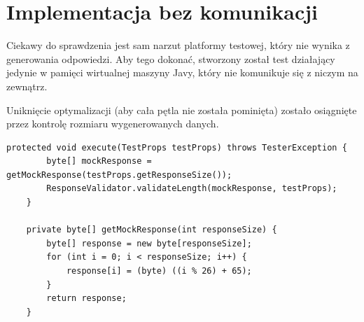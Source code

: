 \section{Implementacja bez komunikacji}

Ciekawy do sprawdzenia jest sam narzut platformy testowej, który nie wynika z generowania odpowiedzi. Aby tego dokonać, stworzony został test działający jedynie w pamięci wirtualnej maszyny Javy, który nie komunikuje się z niczym na zewnątrz.

Uniknięcie optymalizacji (aby cała pętla nie została pominięta) zostało osiągnięte przez kontrolę rozmiaru wygenerowanych danych.

\begin{lstlisting}[caption={Test sprawdzający narzut samej platformy.},captionpos=b]
    protected void execute(TestProps testProps) throws TesterException {
        byte[] mockResponse = getMockResponse(testProps.getResponseSize());
        ResponseValidator.validateLength(mockResponse, testProps);
    }

    private byte[] getMockResponse(int responseSize) {
        byte[] response = new byte[responseSize];
        for (int i = 0; i < responseSize; i++) {
            response[i] = (byte) ((i % 26) + 65);
        }
        return response;
    }
\end{lstlisting}
